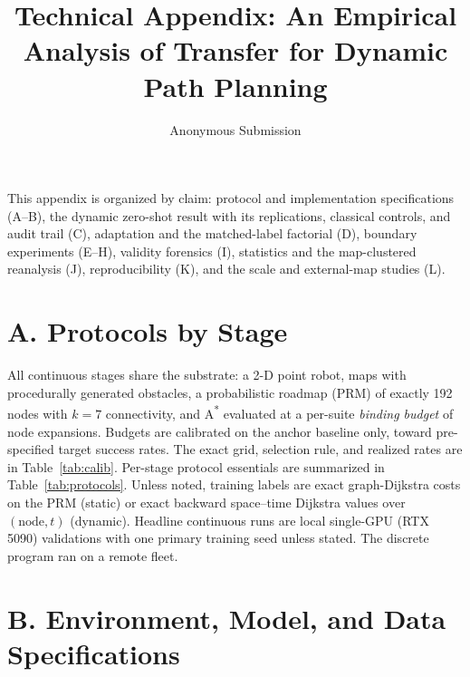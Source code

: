 \documentclass[letterpaper]{article} %
\title{Technical Appendix: An Empirical Analysis of Transfer for Dynamic Path Planning}
\author{Anonymous Submission}
\begin{document}
\maketitle

This appendix is organized by claim: protocol and implementation specifications (A--B), the dynamic zero-shot result with its replications, classical controls, and audit trail (C), adaptation and the matched-label factorial (D), boundary experiments (E--H), validity forensics (I), statistics and the map-clustered reanalysis (J), reproducibility (K), and the scale and external-map studies (L).

\section{A. Protocols by Stage}

All continuous stages share the substrate: a 2-D point robot, maps with procedurally generated obstacles, a probabilistic roadmap (PRM) of exactly 192 nodes with $k{=}7$ connectivity, and A\textsuperscript{*} evaluated at a per-suite \emph{binding budget} of node expansions. Budgets are calibrated on the anchor baseline only, toward pre-specified target success rates. The exact grid, selection rule, and realized rates are in Table~\ref{tab:calib}. Per-stage protocol essentials are summarized in Table~\ref{tab:protocols}. Unless noted, training labels are exact graph-Dijkstra costs on the PRM (static) or exact backward space--time Dijkstra values over $(\text{node},t)$ (dynamic). Headline continuous runs are local single-GPU (RTX 5090) validations with one primary training seed unless stated. The discrete program ran on a remote fleet.

\section{B. Environment, Model, and Data Specifications}
\end{document}
